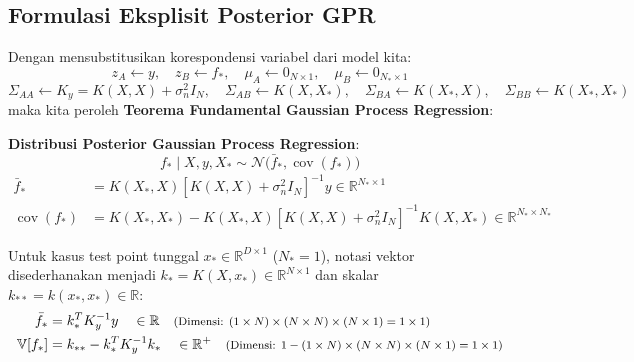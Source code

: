 \documentclass[11pt,a4paper]{article}
\def\boldsymbol#1{#1}%
\def\mathbf#1{#1}%
\begin{document}
\subsection{Formulasi Eksplisit Posterior GPR}
Dengan mensubstitusikan korespondensi variabel dari model kita:
\begin{equation}
\mathbf{z}_A \leftarrow \mathbf{y}, \quad \mathbf{z}_B \leftarrow \mathbf{f}_*, \quad \boldsymbol{\mu}_A \leftarrow \mathbf{0}_{N \times 1}, \quad \boldsymbol{\mu}_B \leftarrow \mathbf{0}_{N_* \times 1}
\end{equation}
\begin{equation}
\Sigma_{AA} \leftarrow K_y = K(X,X) + \sigma_n^2 I_N, \quad \Sigma_{AB} \leftarrow K(X, X_*), \quad \Sigma_{BA} \leftarrow K(X_*, X), \quad \Sigma_{BB} \leftarrow K(X_*, X_*)
\end{equation}
maka kita peroleh \textbf{Teorema Fundamental Gaussian Process Regression}:
\begin{mdframed}[linewidth=1.2pt, linecolor=blue!70!black, backgroundcolor=blue!2]
\textbf{Distribusi Posterior Gaussian Process Regression}:
\begin{equation}
\mathbf{f}_* \mid X, \mathbf{y}, X_* \sim \mathcal{N}\big( \bar{\mathbf{f}}_*, \operatorname{cov}(\mathbf{f}_*) \big)
\end{equation}
\begin{align}
\label{eq:posterior_mean}
\bar{\mathbf{f}}_* &= K(X_*, X) \left[ K(X, X) + \sigma_n^2 I_N \right]^{-1} \mathbf{y} \in \mathbb{R}^{N_* \times 1} \\
\label{eq:posterior_cov}
\operatorname{cov}(\mathbf{f}_*) &= K(X_*, X_*) - K(X_*, X) \left[ K(X, X) + \sigma_n^2 I_N \right]^{-1} K(X, X_*) \in \mathbb{R}^{N_* \times N_*}
\end{align}
\end{mdframed}

Untuk kasus test point tunggal $\mathbf{x}_* \in \mathbb{R}^{D \times 1}$ ($N_* = 1$), notasi vektor disederhanakan menjadi $\mathbf{k}_* = K(X, \mathbf{x}_*) \in \mathbb{R}^{N \times 1}$ dan skalar $k_{**} = k(\mathbf{x}_*, \mathbf{x}_*) \in \mathbb{R}$:
\begin{align}
\bar{f}_* &= \mathbf{k}_*^T K_y^{-1} \mathbf{y} \quad \in \mathbb{R} \quad \text{\footnotesize (Dimensi: $(1 \times N) \times (N \times N) \times (N \times 1) = 1 \times 1$)} \\
\mathbb{V}[f_*] &= k_{**} - \mathbf{k}_*^T K_y^{-1} \mathbf{k}_* \quad \in \mathbb{R}^+ \quad \text{\footnotesize (Dimensi: $1 - (1 \times N) \times (N \times N) \times (N \times 1) = 1 \times 1$)}
\end{align}
\end{document}
